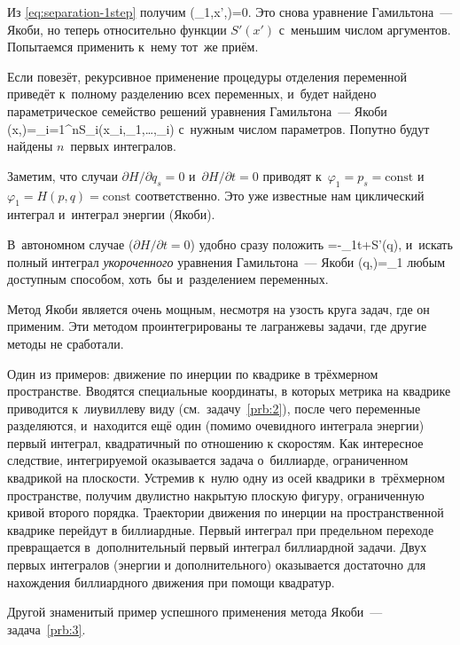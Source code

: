 \documentclass[a4paper,11pt]{article}
\def\[#1\]{\begin{align*}#1\end{align*}}
\newcommand\slashfrac[2]{{#1/#2}}
\theoremstyle{definition}
\begin{document}
Из \eqref{eq:separation-1step} получим
	\[
	\tilde\Phi\left(\kappa_1,x',\right)=0.
	\]
Это снова уравнение Гамильтона~— Якоби, но теперь относительно функции $S'(x')$
с~меньшим числом аргументов. Попытаемся применить к~нему тот~же приём.

Если повезёт, рекурсивное применение процедуры отделения переменной приведёт
к~полному разделению всех переменных, и~будет найдено параметрическое семейство
решений уравнения Гамильтона~— Якоби
	\[
	S(x,\kappa)=\sum_{i=1}^nS_i(x_i,\kappa_1,\ldots,\kappa_i)
	\]
с~нужным числом параметров. Попутно будут найдены $n$~первых интегралов.

Заметим, что случаи $\slashfrac{\partial H}{\partial q_s}=0$
и~$\slashfrac{\partial H}{\partial t}=0$ приводят
к~$\varphi_1=p_s=\mathup{const}$ и~$\varphi_1=H(p,q)=\mathup{const}$
соответственно. Это уже известные нам циклический интеграл и~интеграл энергии
(Якоби).

В~автономном случае ($\slashfrac{\partial H}{\partial t}=0$) удобно сразу
положить
	\[
	S=-\kappa_1t+S'(q),
	\]
и~искать полный интеграл \emph{укороченного} уравнения Гамильтона~— Якоби
	\[
	H\left(q,\right)=\kappa_1
	\]
любым доступным способом, хоть~бы и~разделением переменных.

Метод Якоби является очень мощным, несмотря на узость круга задач, где он
применим. Эти методом проинтегрированы те лагранжевы задачи, где другие методы
не сработали.

Один из примеров: движение по инерции по квадрике в трёхмерном пространстве.
Вводятся специальные координаты, в которых метрика на квадрике приводится
к~лиувиллеву виду (см.~задачу~\ref{prb:2}), после чего переменные разделяются,
и~находится ещё один (помимо очевидного интеграла энергии) первый интеграл,
квадратичный по отношению к скоростям. Как интересное следствие, интегрируемой
оказывается задача о~биллиарде, ограниченном квадрикой на плоскости. Устремив
к~нулю одну из осей квадрики в~трёхмерном пространстве, получим двулистно
накрытую плоскую фигуру, ограниченную кривой второго порядка. Траектории
движения по инерции на пространственной квадрике перейдут в биллиардные. Первый
интеграл при предельном переходе превращается в~дополнительный первый интеграл
биллиардной задачи. Двух первых интегралов (энергии и дополнительного)
оказывается достаточно для нахождения биллиардного движения при помощи
квадратур.

Другой знаменитый пример успешного применения метода Якоби~—
задача~\ref{prb:3}.
\end{document}
